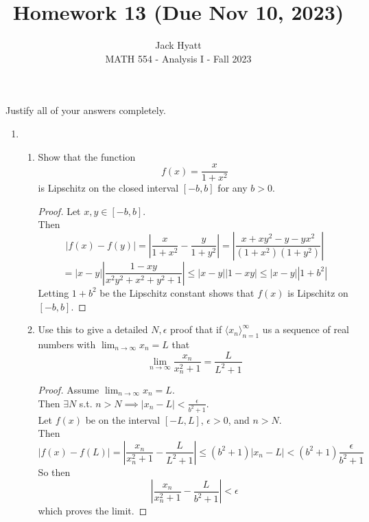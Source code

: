 \documentclass[14pt]{extarticle}
\begin{document}
	
	
	
	\title{Homework 13 (Due Nov 10, 2023)}
	\author{Jack Hyatt\\ %
		MATH 554 - Analysis I - Fall 2023} 
	
	\maketitle
	
	Justify all of your answers completely.\\
	
	
	\medskip 
	
	\begin{enumerate}
		\item
		\begin{enumerate}
			\item Show that the function \[f(x) = \frac{x}{1+x^2}\] is Lipschitz on the closed interval $[-b,b]$ for any $b>0$.
			\begin{proof}
				Let $x,y \in [-b,b]$.\\
				Then 
				\[|f(x) - f(y)| = \left|\frac{x}{1+x^2} - \frac{y}{1+y^2}\right| = \left|\frac{x+xy^2-y-yx^2}{(1+x^2)(1+y^2)}\right|\]
				\[=|x-y|\left|\frac{1-xy}{x^2y^2+x^2+y^2+1}\right| \leq |x-y||1-xy| \leq |x-y||1+b^2|\]
				Letting $1+b^2$ be the Lipschitz constant shows that $f(x)$ is Lipschitz on $[-b,b]$.
			\end{proof}
			\item Use this to give a detailed $N,\epsilon$ proof that if $\langle x_n \rangle_{n=1}^\infty$ us a sequence of real numbers with $\lim_{n\rightarrow\infty}x_n=L$ that
			\[\lim_{n\rightarrow\infty}\frac{x_n}{x^2_n+1} = \frac{L}{L^2+1}\]
			\begin{proof}
				Assume $\lim_{n\rightarrow\infty} x_n = L$.\\
				Then $\exists N$ s.t. $n>N \implies |x_n - L| < \frac{\epsilon}{b^2+1}$.\\
				Let $f(x)$ be on the interval $[-L,L]$, $\epsilon>0$, and $n>N$.\\
				Then 
				\[|f(x) - f(L)| = \left|\frac{x_n}{x_n^2+1} - \frac{L}{L^2+1}\right| \leq (b^2+1)|x_n - L| < (b^2+1) \frac{\epsilon}{b^2+1}\]
				So then 
				\[\left|\frac{x_n}{x_n^2+1} - \frac{L}{b^2+1}\right| < \epsilon\]
				which proves the limit.
			\end{proof}
		\end{enumerate}
	

\end{enumerate}
\end{document}

